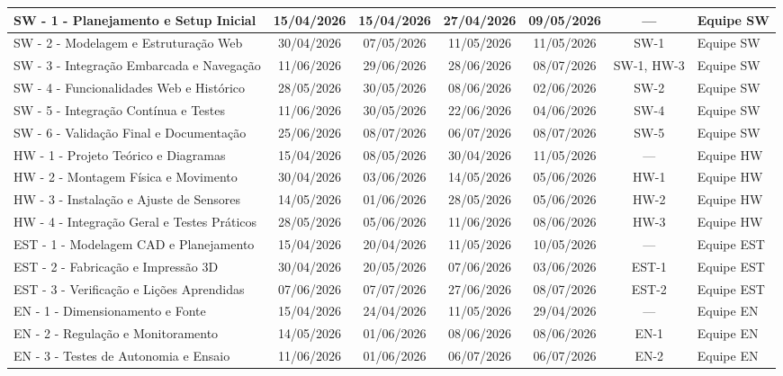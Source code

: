 \begin{landscape}
\begin{center}
\begin{footnotesize}
\begin{longtable}{|p{6.5cm}|c|c|c|c|c|p{4cm}|}
SW - 1 - Planejamento e Setup Inicial & 15/04/2026 & 15/04/2026 & 27/04/2026 & 09/05/2026 & --- & Equipe SW \\ \hline
SW - 2 - Modelagem e Estruturação Web & 30/04/2026 & 07/05/2026 & 11/05/2026 & 11/05/2026 & SW-1 & Equipe SW \\ \hline
SW - 3 - Integração Embarcada e Navegação & 11/06/2026 & 29/06/2026 & 28/06/2026 & 08/07/2026 & SW-1, HW-3 & Equipe SW \\ \hline
SW - 4 - Funcionalidades Web e Histórico & 28/05/2026 & 30/05/2026 & 08/06/2026 & 02/06/2026 & SW-2 & Equipe SW \\ \hline
SW - 5 - Integração Contínua e Testes & 11/06/2026 & 30/05/2026 & 22/06/2026 & 04/06/2026 & SW-4 & Equipe SW \\ \hline
SW - 6 - Validação Final e Documentação & 25/06/2026 & 08/07/2026 & 06/07/2026 & 08/07/2026 & SW-5 & Equipe SW \\ \hline

HW - 1 - Projeto Teórico e Diagramas & 15/04/2026 & 08/05/2026 & 30/04/2026 & 11/05/2026 & --- & Equipe HW \\ \hline
HW - 2 - Montagem Física e Movimento & 30/04/2026 & 03/06/2026 & 14/05/2026 & 05/06/2026 & HW-1 & Equipe HW \\ \hline
HW - 3 - Instalação e Ajuste de Sensores & 14/05/2026 & 01/06/2026 & 28/05/2026 & 05/06/2026  & HW-2 & Equipe HW \\ \hline
HW - 4 - Integração Geral e Testes Práticos & 28/05/2026 & 05/06/2026 & 11/06/2026 & 08/06/2026 & HW-3 & Equipe HW \\ \hline

EST - 1 - Modelagem CAD e Planejamento & 15/04/2026 & 20/04/2026 & 11/05/2026 & 10/05/2026 & --- & Equipe EST \\ \hline
EST - 2 - Fabricação e Impressão 3D & 30/04/2026 & 20/05/2026 & 07/06/2026 & 03/06/2026 & EST-1 & Equipe EST \\ \hline
EST - 3 - Verificação e Lições Aprendidas & 07/06/2026 & 07/07/2026 & 27/06/2026 & 08/07/2026 & EST-2 & Equipe EST \\ \hline

EN - 1 - Dimensionamento e Fonte & 15/04/2026 & 24/04/2026 & 11/05/2026 & 29/04/2026 & --- & Equipe EN \\ \hline
EN - 2 - Regulação e Monitoramento & 14/05/2026 & 01/06/2026 & 08/06/2026 & 08/06/2026 & EN-1 & Equipe EN \\ \hline
EN - 3 - Testes de Autonomia e Ensaio & 11/06/2026 & 01/06/2026 & 06/07/2026 & 06/07/2026 & EN-2 & Equipe EN \\ \hline


\end{longtable}
\end{footnotesize}
\end{center}
\end{landscape}
